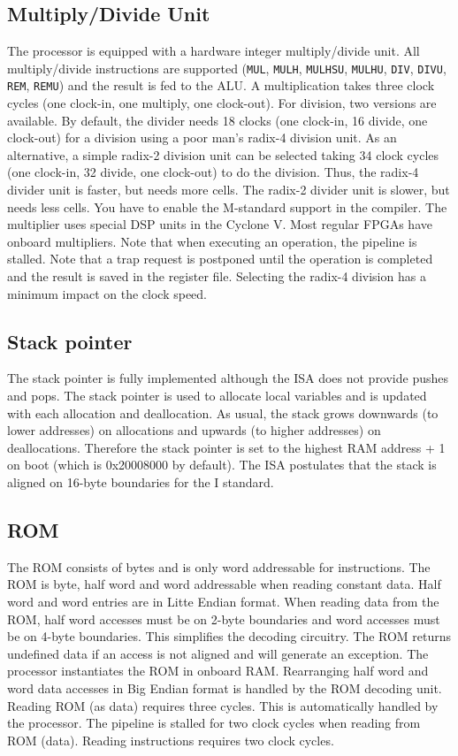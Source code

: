 \documentclass[12pt]{article}
\begin{document}
\subsection{Multiply/Divide Unit}
The processor is equipped with a hardware integer multiply/divide unit. All multiply/divide instructions are supported (\lstinline|MUL|, \lstinline|MULH|, \lstinline|MULHSU|, \lstinline|MULHU|, \lstinline|DIV|, \lstinline|DIVU|, \lstinline|REM|, \lstinline|REMU|) and the result is fed to the ALU. A multiplication takes three clock cycles (one clock-in, one multiply, one clock-out). For division, two versions are available. By default, the divider needs 18 clocks (one clock-in, 16 divide, one clock-out) for a division using a poor man's radix-4 division unit. As an alternative, a simple radix-2 division unit can be selected taking 34 clock cycles (one clock-in, 32 divide, one clock-out) to do the division.  Thus, the radix-4 divider unit is faster, but needs more cells. The radix-2 divider unit is slower, but needs less cells. You have to enable the M-standard support in the compiler. The multiplier uses special DSP units in the Cyclone V. Most regular FPGAs have onboard multipliers. Note that when executing an operation, the pipeline is stalled. Note that a trap request is postponed until the operation is completed and the result is saved in the register file. Selecting the radix-4 division has a minimum impact on the clock speed.


\subsection{Stack pointer}
The stack pointer is fully implemented although the ISA does not provide pushes and pops. The stack pointer is used to allocate local variables and is updated with each allocation and deallocation. As usual, the stack grows downwards (to lower addresses) on allocations and upwards (to higher addresses) on deallocations. Therefore the stack pointer is set to the highest RAM address + 1 on boot (which is 0x20008000 by default). The ISA postulates that the stack is aligned on 16-byte boundaries for the I standard.


\subsection{ROM}
\label{sec:rom}
The ROM consists of bytes and is only word addressable for instructions. The ROM is byte, half word and word addressable when reading constant data. Half word and word entries are in Litte Endian format. When reading data from the ROM, half word accesses must be on 2-byte boundaries and word accesses must be on 4-byte boundaries. This simplifies the decoding circuitry. The ROM returns undefined data if an access is not aligned and will generate an exception. The processor instantiates the ROM in onboard RAM. Rearranging half word and word data accesses in Big Endian format is handled by the ROM decoding unit. Reading ROM (as data) requires three cycles.  This is automatically handled by the processor. The pipeline is stalled for two clock cycles when reading from ROM (data). Reading instructions requires two clock cycles.
\end{document}
